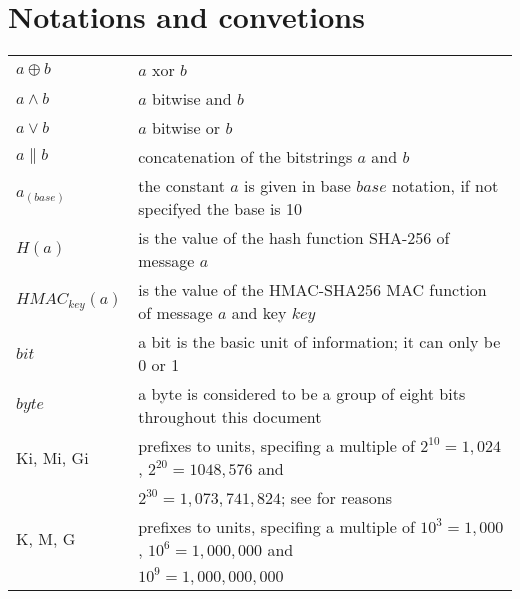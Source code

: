 \section{Notations and convetions}
\begin{tabular}{ll}
$a \oplus b$ & $a$ xor $b$ \\
$a \wedge b$ & $a$ bitwise and $b$ \\
$a \vee b$ & $a$ bitwise or $b$ \\
$a \parallel b$ & concatenation of the bitstrings $a$ and $b$ \\
$a_{(base)}$ & the constant $a$ is given in base $base$ notation, if not specifyed the base is 10\\
$H(a)$ & is the value of the hash function SHA-256 of message $a$ \\
$HMAC_{key}(a)$ & is the value of the HMAC-SHA256 MAC function of message $a$ and key $key$ \\
$bit$ & a bit is the basic unit of information; it can only be 0 or 1 \\
$byte$ & a byte is considered to be a group of eight bits throughout this document \\
Ki, Mi, Gi & prefixes to units, specifing a multiple of $2^{10} = 1,024$, $2^{20} = 1048,576$ and\\ & $2^{30} = 1,073,741,824$; see \cite{IEC60027-2} for reasons \\
K, M, G & prefixes to units, specifing a multiple of $10^3 = 1,000$, $10^6 = 1,000,000$ and\\ & $10^9=1,000,000,000$ \\ 
\end{tabular}